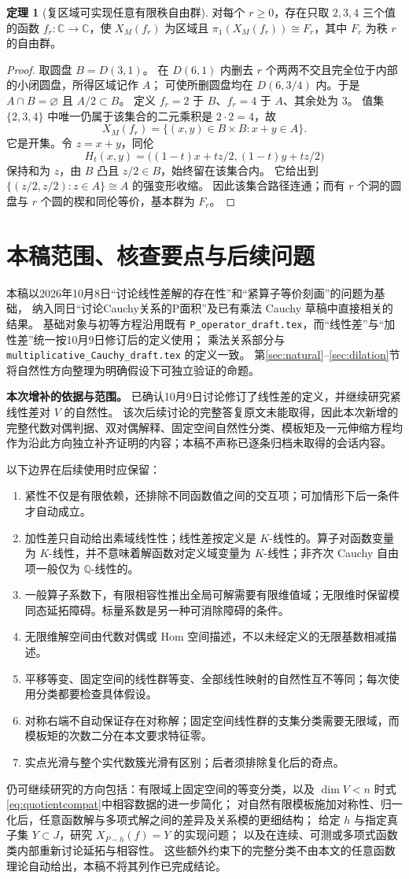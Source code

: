 \documentclass[UTF8,11pt,a4paper]{ctexart}
\theoremstyle{definition}
\newtheorem{theorem}{定理}[section]
\newcommand{\Q}{\mathbb Q}
\newcommand{\C}{\mathbb C}
\begin{document}
\begin{theorem}[复区域可实现任意有限秩自由群]
对每个 $r\ge0$，存在只取 $2,3,4$ 三个值的函数 $f_r:\C\to\C$，使 $X_M(f_r)$ 为区域且
$\pi_1(X_M(f_r))\cong F_r$，其中 $F_r$ 为秩 $r$ 的自由群。
\end{theorem}
\begin{proof}
取圆盘 $B=D(3,1)$。
在 $D(6,1)$ 内删去 $r$ 个两两不交且完全位于内部的小闭圆盘，所得区域记作 $A$；
可使所删圆盘均在 $D(6,3/4)$ 内。于是 $A\cap B=\varnothing$ 且 $A/2\subset B$。
定义 $f_r=2$ 于 $B$、$f_r=4$ 于 $A$、其余处为 $3$。
值集 $\{2,3,4\}$ 中唯一仍属于该集合的二元乘积是 $2\cdot2=4$，故
\[
 X_M(f_r)=\{(x,y)\in B\times B:x+y\in A\}.
\]
它是开集。令 $z=x+y$，同伦
\[
 H_t(x,y)=\bigl((1-t)x+tz/2,(1-t)y+tz/2\bigr)
\]
保持和为 $z$，由 $B$ 凸且 $z/2\in B$，始终留在该集合内。
它给出到 $\{(z/2,z/2):z\in A\}\cong A$ 的强变形收缩。
因此该集合路径连通；而有 $r$ 个洞的圆盘与 $r$ 个圆的楔和同伦等价，基本群为 $F_r$。
\end{proof}

\section{本稿范围、核查要点与后续问题}\label{sec:scope}
本稿以2026年10月8日“讨论线性差解的存在性”和“紧算子等价刻画”的问题为基础，
纳入同日“讨论Cauchy关系的P面积”及已有乘法 Cauchy 草稿中直接相关的结果。
基础对象与初等方程沿用既有 \texttt{P\_operator\_draft.tex}，而“线性差”与“加性差”统一按10月9日修订后的定义使用；
乘法关系部分与 \texttt{multiplicative\_Cauchy\_draft.tex} 的定义一致。
第\ref{sec:natural}--\ref{sec:dilation}节将自然性方向整理为明确假设下可独立验证的命题。

\medskip
\noindent\textbf{本次增补的依据与范围。}
已确认10月9日讨论修订了线性差的定义，并继续研究紧线性差对 $V$ 的自然性。
该次后续讨论的完整答复原文未能取得，因此本次新增的完整代数对偶判据、双对偶解释、固定空间自然性分类、模板矩及一元伸缩方程均作为沿此方向独立补齐证明的内容；本稿不声称已逐条归档未取得的会话内容。

以下边界在后续使用时应保留：
\begin{enumerate}
\item 紧性不仅是有限依赖，还排除不同函数值之间的交互项；可加情形下后一条件才自动成立。
\item 加性差只自动给出素域线性性；线性差按定义是 $K$-线性的。算子对函数变量为 $K$-线性，并不意味着解函数对定义域变量为 $K$-线性；非齐次 Cauchy 自由项一般仅为 $\Q$-线性的。
\item 一般算子系数下，有限相容性推出全局可解需要有限维值域；无限维时保留模同态延拓障碍。标量系数是另一种可消除障碍的条件。
\item 无限维解空间由代数对偶或 Hom 空间描述，不以未经定义的无限基数相减描述。
\item 平移等变、固定空间的线性群等变、全部线性映射的自然性互不等同；每次使用分类都要检查具体假设。
\item 对称右端不自动保证存在对称解；固定空间线性群的支集分类需要无限域，而模板矩的次数二分在本文要求特征零。
\item 实点光滑与整个实代数簇光滑有区别；后者须排除复化后的奇点。
\end{enumerate}

仍可继续研究的方向包括：有限域上固定空间的等变分类，以及 $\dim V<n$ 时式\eqref{eq:quotientcompat}中相容数据的进一步简化；
对自然有限模板施加对称性、归一化后，任意函数解与多项式解之间的差异及关系模的更细结构；
给定 $h$ 与指定真子集 $Y\subset J$，研究 $X_{P-h}(f)=Y$ 的实现问题；
以及在连续、可测或多项式函数类内部重新讨论延拓与相容性。
这些额外约束下的完整分类不由本文的任意函数理论自动给出，本稿不将其列作已完成结论。
\end{document}
